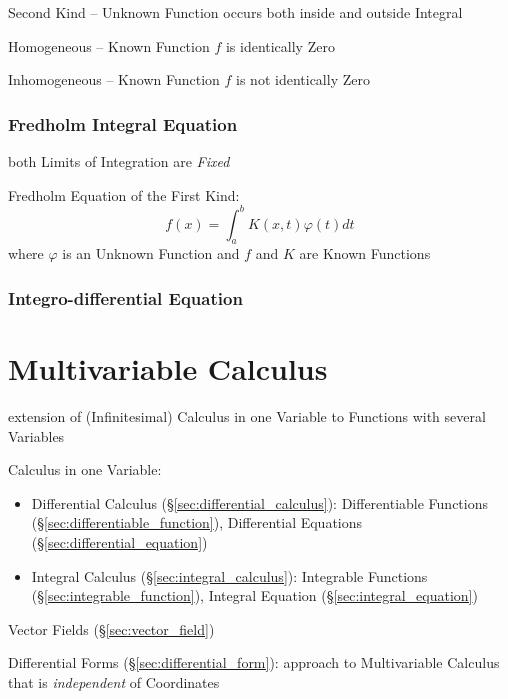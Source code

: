 {Second Kind -- Unknown Function occurs both inside and outside Integral

Homogeneous -- Known Function $f$ is identically Zero

Inhomogeneous -- Known Function $f$ is not identically Zero



\subsubsection{Fredholm Integral Equation}\label{sec:fredholm_integral}

both Limits of Integration are \emph{Fixed}

Fredholm Equation of the First Kind:
\[
  f(x) = \int_a^b K(x,t) \varphi(t) dt
\]
where $\varphi$ is an Unknown Function and $f$ and $K$ are Known Functions



\subsubsection{Integro-differential Equation}\label{sec:integro_differential}



\section{Multivariable Calculus}\label{sec:multivariable_calculus}

extension of (Infinitesimal) Calculus in one Variable to Functions with several
Variables

Calculus in one Variable:
\begin{itemize}
\item Differential Calculus (\S\ref{sec:differential_calculus}): Differentiable
  Functions (\S\ref{sec:differentiable_function}), Differential Equations
  (\S\ref{sec:differential_equation})
\item Integral Calculus (\S\ref{sec:integral_calculus}): Integrable Functions
  (\S\ref{sec:integrable_function}), Integral Equation
  (\S\ref{sec:integral_equation})
\end{itemize}

\fist Vector Fields (\S\ref{sec:vector_field})

\fist Differential Forms (\S\ref{sec:differential_form}): approach to
Multivariable Calculus that is \emph{independent} of Coordinates

}

